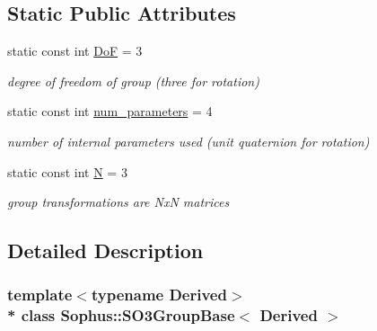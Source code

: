 \subsection*{Static Public Attributes}
\begin{DoxyCompactItemize}
\item 
static const int \hyperlink{class_sophus_1_1_s_o3_group_base_ad12ec6c47a2206217f337ea90884b4c1}{DoF} = 3\hypertarget{class_sophus_1_1_s_o3_group_base_ad12ec6c47a2206217f337ea90884b4c1}{}\label{class_sophus_1_1_s_o3_group_base_ad12ec6c47a2206217f337ea90884b4c1}

\begin{DoxyCompactList}\small\item\em degree of freedom of group (three for rotation) \end{DoxyCompactList}\item 
static const int \hyperlink{class_sophus_1_1_s_o3_group_base_ae2da1635f11e6648cc869c458c6d4251}{num\+\_\+parameters} = 4\hypertarget{class_sophus_1_1_s_o3_group_base_ae2da1635f11e6648cc869c458c6d4251}{}\label{class_sophus_1_1_s_o3_group_base_ae2da1635f11e6648cc869c458c6d4251}

\begin{DoxyCompactList}\small\item\em number of internal parameters used (unit quaternion for rotation) \end{DoxyCompactList}\item 
static const int \hyperlink{class_sophus_1_1_s_o3_group_base_ad7937061e3b4eab530142d5e1a1921c2}{N} = 3\hypertarget{class_sophus_1_1_s_o3_group_base_ad7937061e3b4eab530142d5e1a1921c2}{}\label{class_sophus_1_1_s_o3_group_base_ad7937061e3b4eab530142d5e1a1921c2}

\begin{DoxyCompactList}\small\item\em group transformations are NxN matrices \end{DoxyCompactList}\end{DoxyCompactItemize}


\subsection{Detailed Description}
\subsubsection*{template$<$typename Derived$>$\\*
class Sophus\+::\+S\+O3\+Group\+Base$<$ Derived $>$}

